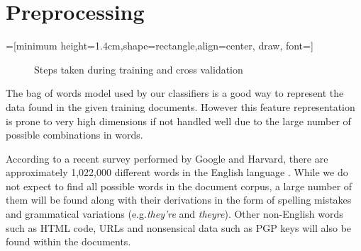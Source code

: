 \section{Preprocessing}
=[minimum height=1.4cm,shape=rectangle,align=center, draw, font=\small]
\begin{figure}[t]
    \caption{Steps taken during training and cross validation}
    \label{fig:steps}
\end{figure}

The bag of words model used by our classifiers is a good way to represent the data found in the given training documents. However this feature representation is prone to very high dimensions if not handled well due to the large number of possible combinations in words. 

According to a recent survey performed by Google and Harvard, there are approximately 1,022,000 different words in the English language \cite{google2010words}. While we do not expect to find all possible words in the document corpus, a large number of them will be found along with their derivations in the form of spelling mistakes and grammatical variations (e.g.{\it they're} and {\it theyre}). Other non-English words such as HTML code, URLs and nonsensical data such as PGP keys will also be found within the documents.

